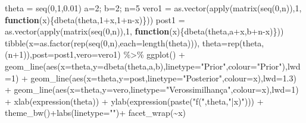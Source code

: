 \documentclass[
]{book}
\newenvironment{Shaded}{\begin{snugshade}}{\end{snugshade}}
\newcommand{\AttributeTok}[1]{\textcolor[rgb]{0.77,0.63,0.00}{#1}}
\newcommand{\ControlFlowTok}[1]{\textcolor[rgb]{0.13,0.29,0.53}{\textbf{#1}}}
\newcommand{\DecValTok}[1]{\textcolor[rgb]{0.00,0.00,0.81}{#1}}
\newcommand{\FloatTok}[1]{\textcolor[rgb]{0.00,0.00,0.81}{#1}}
\newcommand{\FunctionTok}[1]{\textcolor[rgb]{0.00,0.00,0.00}{#1}}
\newcommand{\NormalTok}[1]{#1}
\newcommand{\OtherTok}[1]{\textcolor[rgb]{0.56,0.35,0.01}{#1}}
\newcommand{\SpecialCharTok}[1]{\textcolor[rgb]{0.00,0.00,0.00}{#1}}
\newcommand{\StringTok}[1]{\textcolor[rgb]{0.31,0.60,0.02}{#1}}
\begin{document}
\begin{Shaded}
\begin{Highlighting}[]
\NormalTok{theta }\OtherTok{=} \FunctionTok{seq}\NormalTok{(}\DecValTok{0}\NormalTok{,}\DecValTok{1}\NormalTok{,}\FloatTok{0.01}\NormalTok{)}
\NormalTok{a}\OtherTok{=}\DecValTok{2}\NormalTok{; b}\OtherTok{=}\DecValTok{2}\NormalTok{;}
\NormalTok{n}\OtherTok{=}\DecValTok{5}
\NormalTok{vero1 }\OtherTok{=} \FunctionTok{as.vector}\NormalTok{(}\FunctionTok{apply}\NormalTok{(}\FunctionTok{matrix}\NormalTok{(}\FunctionTok{seq}\NormalTok{(}\DecValTok{0}\NormalTok{,n)),}\DecValTok{1}\NormalTok{,}
            \ControlFlowTok{function}\NormalTok{(x)\{}\FunctionTok{dbeta}\NormalTok{(theta,}\DecValTok{1}\SpecialCharTok{+}\NormalTok{x,}\DecValTok{1}\SpecialCharTok{+}\NormalTok{n}\SpecialCharTok{{-}}\NormalTok{x)\}))}
\NormalTok{post1 }\OtherTok{=} \FunctionTok{as.vector}\NormalTok{(}\FunctionTok{apply}\NormalTok{(}\FunctionTok{matrix}\NormalTok{(}\FunctionTok{seq}\NormalTok{(}\DecValTok{0}\NormalTok{,n)),}\DecValTok{1}\NormalTok{,}
            \ControlFlowTok{function}\NormalTok{(x)\{}\FunctionTok{dbeta}\NormalTok{(theta,a}\SpecialCharTok{+}\NormalTok{x,b}\SpecialCharTok{+}\NormalTok{n}\SpecialCharTok{{-}}\NormalTok{x)\}))}
\FunctionTok{tibble}\NormalTok{(}\AttributeTok{x=}\FunctionTok{as.factor}\NormalTok{(}\FunctionTok{rep}\NormalTok{(}\FunctionTok{seq}\NormalTok{(}\DecValTok{0}\NormalTok{,n),}\AttributeTok{each=}\FunctionTok{length}\NormalTok{(theta))),}
    \AttributeTok{theta=}\FunctionTok{rep}\NormalTok{(theta,(n}\SpecialCharTok{+}\DecValTok{1}\NormalTok{)),}\AttributeTok{post=}\NormalTok{post1,}\AttributeTok{vero=}\NormalTok{vero1) }\SpecialCharTok{\%\textgreater{}\%} 
  \FunctionTok{ggplot}\NormalTok{() }\SpecialCharTok{+} 
  \FunctionTok{geom\_line}\NormalTok{(}\FunctionTok{aes}\NormalTok{(}\AttributeTok{x=}\NormalTok{theta,}\AttributeTok{y=}\FunctionTok{dbeta}\NormalTok{(theta,a,b),}\AttributeTok{linetype=}\StringTok{"Prior"}\NormalTok{,}\AttributeTok{colour=}\StringTok{"Prior"}\NormalTok{),}\AttributeTok{lwd=}\DecValTok{1}\NormalTok{) }\SpecialCharTok{+}
  \FunctionTok{geom\_line}\NormalTok{(}\FunctionTok{aes}\NormalTok{(}\AttributeTok{x=}\NormalTok{theta,}\AttributeTok{y=}\NormalTok{post,}\AttributeTok{linetype=}\StringTok{"Posterior"}\NormalTok{,}\AttributeTok{colour=}\NormalTok{x),}\AttributeTok{lwd=}\FloatTok{1.3}\NormalTok{) }\SpecialCharTok{+}
  \FunctionTok{geom\_line}\NormalTok{(}\FunctionTok{aes}\NormalTok{(}\AttributeTok{x=}\NormalTok{theta,}\AttributeTok{y=}\NormalTok{vero,}\AttributeTok{linetype=}\StringTok{"Verossimilhança"}\NormalTok{,}\AttributeTok{colour=}\NormalTok{x),}\AttributeTok{lwd=}\DecValTok{1}\NormalTok{) }\SpecialCharTok{+} 
  \FunctionTok{xlab}\NormalTok{(}\FunctionTok{expression}\NormalTok{(theta)) }\SpecialCharTok{+} \FunctionTok{ylab}\NormalTok{(}\FunctionTok{expression}\NormalTok{(}\FunctionTok{paste}\NormalTok{(}\StringTok{"f("}\NormalTok{,theta,}\StringTok{"|x)"}\NormalTok{))) }\SpecialCharTok{+}
  \FunctionTok{theme\_bw}\NormalTok{()}\SpecialCharTok{+}\FunctionTok{labs}\NormalTok{(}\AttributeTok{linetype=}\StringTok{""}\NormalTok{)}\SpecialCharTok{+}
  \FunctionTok{facet\_wrap}\NormalTok{(}\SpecialCharTok{\textasciitilde{}}\NormalTok{x)}
\end{Highlighting}
\end{Shaded}
\end{document}
